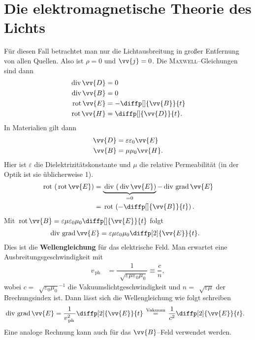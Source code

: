 \documentclass[a4paper,12pt]{article}
\numberwithin{equation}{section}
\begin{document}
\section{Die elektromagnetische Theorie des Lichts}
Für diesen Fall betrachtet man nur die Lichtausbreitung in großer Entfernung von allen Quellen. Also ist $\rho =0$ und $\vv{j}=0$. Die \textsc{Maxwell}--Gleichungen sind dann
\begin{align}
        \,\text{div}\,\vv{D}&=0\\
        \,\text{div}\,\vv{B}&=0\\
        \,\text{rot}\,\vv{E}&=-\diffp[]{\vv{B}}{t}\\
        \,\text{rot}\,\vv{H}&=\diffp[]{\vv{D}}{t}
.\end{align}
In Materialien gilt dann
\begin{align} 
        \vv{D}&=\varepsilon \varepsilon _0\vv{E}\\
        \vv{B}&=\mu \mu _0\vv{H}
.\end{align} 
Hier ist $\varepsilon $ die Dielektrizitätskonstante und $\mu $ die relative Permeabilität (in der Optik ist sie üblicherweise 1). \\\indent
\begin{align} 
        \,\text{rot}\,\left(\,\text{rot}\,\vv{E}\right)&=\underbrace{\,\text{div}\,\left(\,\text{div}\,\vv{E}\right)}_{=0}-\,\text{div}\,\,\text{grad}\,\vv{E}\\
                                                       &=\,\text{rot}\,\left(-\diffp[]{\vv{B}}{t}\right)
.\end{align} 
Mit $\,\text{rot}\,\vv{B}=\varepsilon\mu \varepsilon _0 \mu _0\diffp[]{\vv{E}}{t}$ folgt
\begin{align} 
        \,\text{div}\,\,\text{grad}\,\vv{E}&=\varepsilon \mu \varepsilon _0\mu _0\diffp[2]{\vv{E}}{t}
.\end{align} 
Dies ist die \textbf{Wellengleichung} für das elektrische Feld. Man erwartet eine Ausbreitungsgeschwindigkeit mit
\begin{align} 
        v_{\,\text{ph}\,}&=\dfrac{1}{\,\sqrt[]{\varepsilon \mu \varepsilon _0\mu _0}}\equiv \dfrac{c}{n}
,\end{align} 
wobei $c=\,\sqrt[]{\varepsilon _0\mu _0}^{-1}$ die Vakuumslichtgeschwindigkeit und $n=\,\sqrt[]{\varepsilon \mu }$ der Brechungsindex ist. Dann lässt sich die Wellengleichung wie folgt schreiben
\begin{align} 
        \,\text{div}\,\,\text{grad}\,\vv{E}&=\dfrac{1}{v_{\,\text{ph}\,}^2}\diffp[2]{\vv{E}}{t}\stackrel{\,\text{Vakuum}\,}{=}\dfrac{1}{c^2}\diffp[2]{\vv{E}}{t}
.\end{align} 
Eine analoge Rechnung kann auch für das $\vv{B}$--Feld verwendet werden.\\\indent
\end{document}
